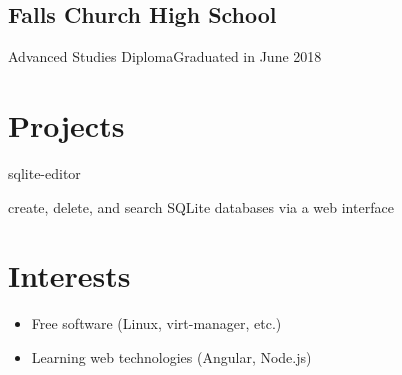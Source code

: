 \documentclass{article}
\begin{document}
\subsection{Falls Church High School}
Advanced Studies Diploma\hfill Graduated in June 2018

\section{Projects}

sqlite-editor \par
create, delete, and search SQLite databases via a web interface

\section{Interests}

\begin{itemize}

\item Free software (Linux, virt-manager, etc.)
\item Learning web technologies (Angular, Node.js) 

\end{itemize}
\end{document}
